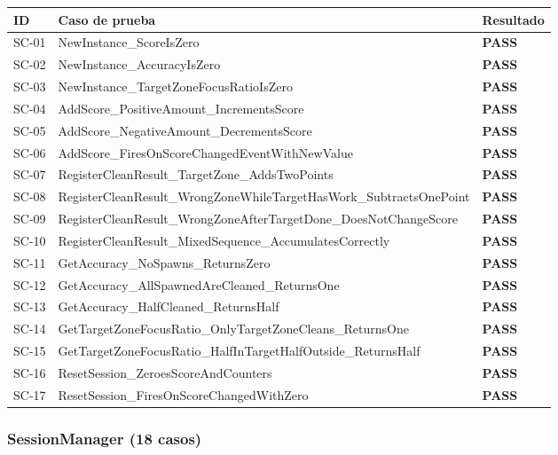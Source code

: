 \documentclass[12pt, a4paper]{article}
\newcommand{\pass}{\textcolor{heroGreen}{\textbf{PASS}}}
\begin{document}
\begin{longtable}{>{\ttfamily\small}p{1cm} p{8.5cm} >{\centering\arraybackslash}p{2cm}}
  \toprule
  \textbf{ID} & \textbf{Caso de prueba} & \textbf{Resultado} \\
  \midrule
  \endhead
  SC-01 & NewInstance\_ScoreIsZero                                    & \pass \\
  SC-02 & NewInstance\_AccuracyIsZero                                 & \pass \\
  SC-03 & NewInstance\_TargetZoneFocusRatioIsZero                     & \pass \\
  SC-04 & AddScore\_PositiveAmount\_IncrementsScore                   & \pass \\
  SC-05 & AddScore\_NegativeAmount\_DecrementsScore                   & \pass \\
  SC-06 & AddScore\_FiresOnScoreChangedEventWithNewValue              & \pass \\
  SC-07 & RegisterCleanResult\_TargetZone\_AddsTwoPoints              & \pass \\
  SC-08 & RegisterCleanResult\_WrongZoneWhileTargetHasWork\_SubtractsOnePoint & \pass \\
  SC-09 & RegisterCleanResult\_WrongZoneAfterTargetDone\_DoesNotChangeScore   & \pass \\
  SC-10 & RegisterCleanResult\_MixedSequence\_AccumulatesCorrectly    & \pass \\
  SC-11 & GetAccuracy\_NoSpawns\_ReturnsZero                          & \pass \\
  SC-12 & GetAccuracy\_AllSpawnedAreCleaned\_ReturnsOne               & \pass \\
  SC-13 & GetAccuracy\_HalfCleaned\_ReturnsHalf                       & \pass \\
  SC-14 & GetTargetZoneFocusRatio\_OnlyTargetZoneCleans\_ReturnsOne   & \pass \\
  SC-15 & GetTargetZoneFocusRatio\_HalfInTargetHalfOutside\_ReturnsHalf & \pass \\
  SC-16 & ResetSession\_ZeroesScoreAndCounters                        & \pass \\
  SC-17 & ResetSession\_FiresOnScoreChangedWithZero                   & \pass \\
  \bottomrule
\end{longtable}

\subsubsection{SessionManager (18 casos)}
\end{document}
